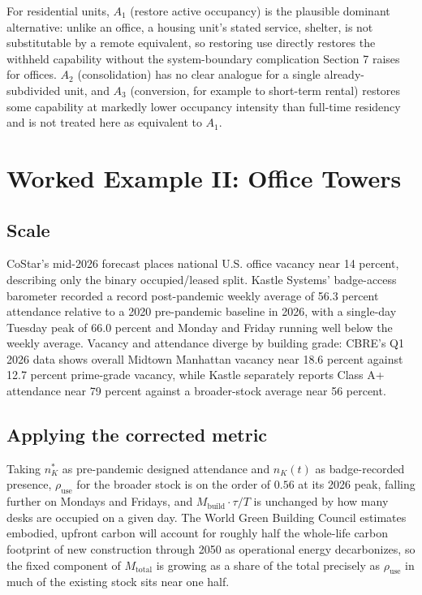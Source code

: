 \documentclass[11pt]{article}
\begin{document}
For residential units, $A_1$ (restore active occupancy) is the plausible dominant alternative: unlike an office, a housing unit's stated service, shelter, is not substitutable by a remote equivalent, so restoring use directly restores the withheld capability without the system-boundary complication Section 7 raises for offices. $A_2$ (consolidation) has no clear analogue for a single already-subdivided unit, and $A_3$ (conversion, for example to short-term rental) restores some capability at markedly lower occupancy intensity than full-time residency and is not treated here as equivalent to $A_1$.

\section{Worked Example II: Office Towers}

\subsection{Scale}

CoStar's mid-2026 forecast places national U.S. office vacancy near 14 percent, describing only the binary occupied/leased split. Kastle Systems' badge-access barometer recorded a record post-pandemic weekly average of 56.3 percent attendance relative to a 2020 pre-pandemic baseline in 2026, with a single-day Tuesday peak of 66.0 percent and Monday and Friday running well below the weekly average. Vacancy and attendance diverge by building grade: CBRE's Q1 2026 data shows overall Midtown Manhattan vacancy near 18.6 percent against 12.7 percent prime-grade vacancy, while Kastle separately reports Class A+ attendance near 79 percent against a broader-stock average near 56 percent.

\subsection{Applying the corrected metric}

Taking $n_K^{*}$ as pre-pandemic designed attendance and $n_K(t)$ as badge-recorded presence, $\rho_{\text{use}}$ for the broader stock is on the order of $0.56$ at its 2026 peak, falling further on Mondays and Fridays, and $M_{\text{build}}\cdot\tau/T$ is unchanged by how many desks are occupied on a given day. The World Green Building Council estimates embodied, upfront carbon will account for roughly half the whole-life carbon footprint of new construction through 2050 as operational energy decarbonizes, so the fixed component of $M_{\text{total}}$ is growing as a share of the total precisely as $\rho_{\text{use}}$ in much of the existing stock sits near one half.
\end{document}
